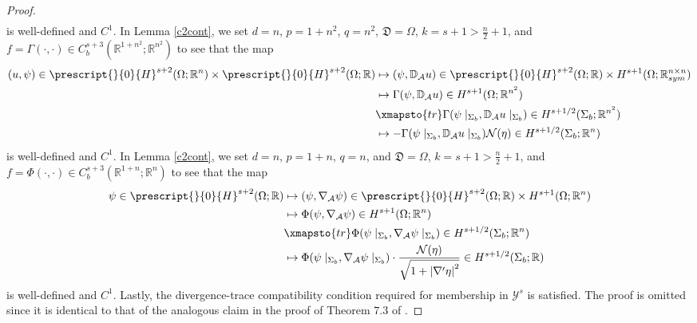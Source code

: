 \documentclass[11pt,letterpaper,reqno]{amsart}
\numberwithin{equation}{section}
\newcommand{\abs}[1]{\left\lvert#1\right\rvert}
\begin{document}
\begin{proof}
\begin{align}
    \end{align}
    is well-defined and \(C^{1}\). In Lemma \ref{c2cont}, we set \(d=n\), \(p=1+n^{2}\), \(q=n^{2}\), \(\mathfrak{D}=\Omega\), \(k=s+1>\frac{n}{2}+1\), and \(f=\Gamma(\cdot,\cdot) \in C_{b}^{s+3}(\mathbb{R}^{1+n^{2}};\mathbb{R}^{n^{2}})\) to see that the map
    \begin{align}
        (u,\psi) \in \prescript{}{0}{H}^{s+2}(\Omega;\mathbb{R}^{n}) \times \prescript{}{0}{H}^{s+2}(\Omega;\mathbb{R}) &\mapsto (\psi,\mathbb{D}_{\mathcal{A}}u) \in \prescript{}{0}{H}^{s+2}(\Omega;\mathbb{R}) \times H^{s+1}(\Omega;\mathbb{R}_{sym}^{n \times n}) \nonumber\\
        &\mapsto \Gamma(\psi,\mathbb{D}_{\mathcal{A}}u) \in H^{s+1}(\Omega;\mathbb{R}^{n^{2}}) \nonumber\\
        &\xmapsto{tr} \Gamma(\psi \mid_{\Sigma_{b}},\mathbb{D}_{\mathcal{A}}u \mid_{\Sigma_{b}}) \in H^{s+1/2}(\Sigma_{b};\mathbb{R}^{n^{2}}) \nonumber\\
        &\mapsto -\Gamma(\psi \mid_{\Sigma_{b}},\mathbb{D}_{\mathcal{A}}u \mid_{\Sigma_{b}})\mathcal{N}(\eta) \in H^{s+1/2}(\Sigma_{b};\mathbb{R}^{n})
    \end{align}
    is well-defined and \(C^{1}\). In Lemma \ref{c2cont}, we set \(d=n\), \(p=1+n\), \(q=n\), and \(\mathfrak{D}=\Omega\), \(k=s+1>\frac{n}{2}+1\), and \(f=\Phi(\cdot,\cdot) \in C_{b}^{s+3}(\mathbb{R}^{1+n};\mathbb{R}^{n})\) to see that the map
    \begin{align}
        \psi \in \prescript{}{0}{H}^{s+2}(\Omega;\mathbb{R}) &\mapsto (\psi,\nabla_{\mathcal{A}}\psi) \in \prescript{}{0}{H}^{s+2}(\Omega;\mathbb{R}) \times H^{s+1}(\Omega;\mathbb{R}^{n}) \nonumber\\
        &\mapsto \Phi(\psi,\nabla_{\mathcal{A}}\psi) \in H^{s+1}(\Omega;\mathbb{R}^{n}) \nonumber\\
        &\xmapsto{tr} \Phi(\psi \mid_{\Sigma_{b}},\nabla_{\mathcal{A}}\psi \mid_{\Sigma_{b}}) \in H^{s+1/2}(\Sigma_{b};\mathbb{R}^{n}) \nonumber\\
        &\mapsto \Phi(\psi \mid_{\Sigma_{b}},\nabla_{\mathcal{A}}\psi\mid_{\Sigma_{b}}) \cdot \frac{\mathcal{N}(\eta)}{\sqrt{1+\abs{\nabla'\eta}^{2}}} \in H^{s+1/2}(\Sigma_{b};\mathbb{R}) 
    \end{align}
    is well-defined and \(C^{1}\). Lastly, the divergence-trace compatibility condition required for membership in \(\mathcal{Y}^{s}\) is satisfied. The proof is omitted since it is identical to that of the analogous claim in the proof of Theorem \(7.3\) of \cite{leoni2023traveling}.
\end{proof}
\end{document}
